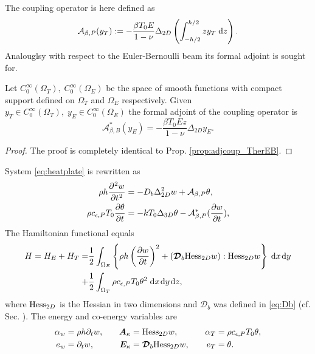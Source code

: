 The coupling operator is here defined as 
\begin{equation}\label{eq:coup_TherK}
\mathcal{A}_{\beta, P}(y_T) :=- \frac{\beta T_0 E}{1 - \nu} \Delta_{2D} \left(\int_{-h/2}^{h/2} z y_T \d{z}\right).
\end{equation}
Analouglsy with respect to the Euler-Bernoulli beam its formal adjoint is sought for.
\begin{proposition}\label{prop:adjcoup_TherK}
	Let $C_0^{\infty}(\Omega_T), \; C_0^{\infty}(\Omega_E)$ be the space of smooth functions with compact support defined on $\Omega_T$ and $\Omega_E$ respectively. Given $y_T \in C_0^{\infty}(\Omega_T), \; y_E \in C_0^{\infty}(\Omega_E)$ the formal adjoint of the coupling operator is 
	\begin{equation}\label{eq:adjcoup_TherP}
	\mathcal{A}_{\beta, B}^*(y_E) = - \frac{\beta T_0 E z}{1-\nu}  \Delta_{2D} y_E.
	\end{equation}
	\begin{proof}
		The proof is completely identical to Prop. \ref{prop:adjcoup_TherEB}.
	\end{proof}
\end{proposition}
 System \ref{eq:heatplate} is rewritten as
\begin{equation}\label{eq:heatplate2}
\begin{aligned}
\rho h \diffp[2]{w}{t} &= -D_b \Delta^2_{2D} w +  \mathcal{A}_{\beta, P} \theta, \\
{\rho c_{\epsilon, P} T_0} \diffp{\theta}{t} &= - {k T_0} \Delta_{3D} \theta -  \mathcal{A}_{\beta, P}^* (\diffp{w}{t}),
\end{aligned}
\end{equation} 
The Hamiltonian functional equals
\begin{equation}
\begin{aligned}
H = H_E + H_T =& \frac{1}{2} \int_{\Omega_E}\left\{\rho h \left(\diffp{w}{t}\right)^2 + (\bm{\mathcal{D}}_b {\Hess}_{2D} w) : {\Hess}_{2D} w\right\} \d{x}\d{y} \\
+  &\frac{1}{2} \int_{\Omega_T}\rho c_{\epsilon, P} T_0 \theta^2\d{x}\d{y}\d{z},
\end{aligned}
\end{equation}
where $\operatorname*{Hess}_{2D}$ is the Hessian in two dimensions and $\bm{\mathcal{D}}_b$ was defined in \eqref{eq:Db} (cf. Sec. ). The energy and co-energy variables are
\begin{equation}
\begin{aligned}[t]
\alpha_w &= \rho h \partial_t w, \\
e_w &= \partial_t w,
\end{aligned} \qquad 
\begin{aligned}[t]
\bm{A}_\kappa &= {\operatorname*{Hess}}_{2D} w, \\
\bm{E}_\kappa &=  \bm{\mathcal{D}}_b {\operatorname*{Hess}}_{2D} w, \\
\end{aligned} \qquad 
\begin{aligned}[t]
\alpha_T &= {\rho c_{\epsilon, P} T_0}  \theta, \\
e_T & = \theta.
\end{aligned}
\end{equation}
